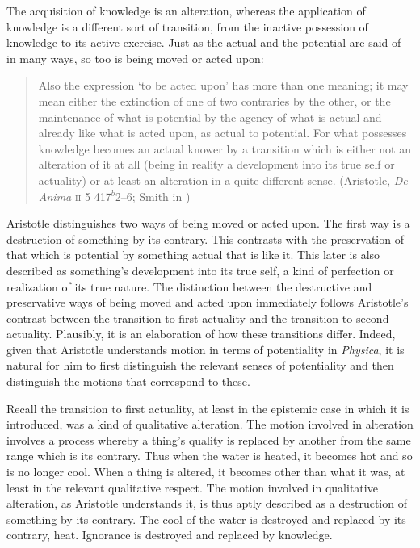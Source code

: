 The acquisition of knowledge is an alteration, whereas the application of knowledge is a different sort of transition, from the inactive possession of knowledge to its active exercise. Just as the actual and the potential are said of in many ways, so too is being moved or acted upon:
\begin{quote}
	Also the expression `to be acted upon' has more than one meaning; it may mean either the extinction of one of two contraries by the other, or the maintenance of what is potential by the agency of what is actual and already like what is acted upon, as actual to potential. For what possesses knowledge becomes an actual knower by a transition which is either not an alteration of it at all (being in reality a development into its true self or actuality) or at least an alteration in a quite different sense. (Aristotle, \emph{De Anima} \textsc{ii} 5 417\( ^{b} \)2--6; Smith in \citealt[30]{Barnes:1984uq})
\end{quote}
Aristotle distinguishes two ways of being moved or acted upon. The first way is a destruction of something by its contrary. This contrasts with the preservation of that which is potential by something actual that is like it. This later is also described as something's development into its true self, a kind of perfection or realization of its true nature. The distinction between the destructive and preservative ways of being moved and acted upon immediately follows Aristotle's contrast between the transition to first actuality and the transition to second actuality. Plausibly, it is an elaboration of how these transitions differ. Indeed, given that Aristotle understands motion in terms of potentiality in \emph{Physica}, it is natural for him to first distinguish the relevant senses of potentiality and then distinguish the motions that correspond to these.

Recall the transition to first actuality, at least in the epistemic case in which it is introduced, was a kind of qualitative alteration. The motion involved in alteration involves a process whereby a thing's quality is replaced by another from the same range which is its contrary. Thus when the water is heated, it becomes hot and so is no longer cool. When a thing is altered, it becomes other than what it was, at least in the relevant qualitative respect. The motion involved in qualitative alteration, as Aristotle understands it, is thus aptly described as a destruction of something by its contrary. The cool of the water is destroyed and replaced by its contrary, heat. Ignorance is destroyed and replaced by knowledge.

